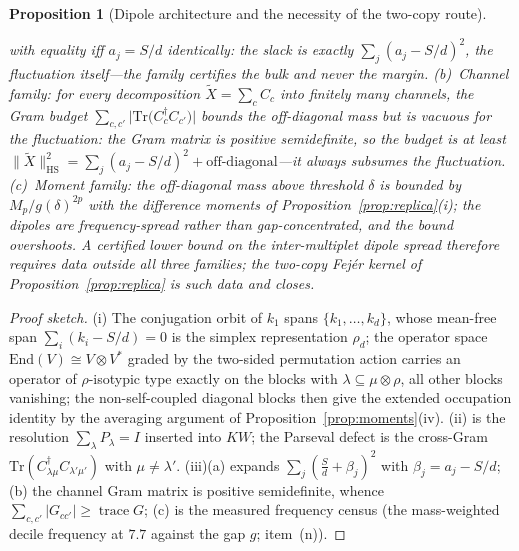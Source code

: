 \documentclass[11pt,a4paper]{article}
\theoremstyle{plain}
\newtheorem{proposition}[theorem]{Proposition}
\theoremstyle{definition}
\theoremstyle{remark}
\begin{document}
\begin{proposition}[Dipole architecture and the necessity of the two-copy
route]
\begin{enumerate}[leftmargin=1.6em]
with equality iff $a_j=S/d$ identically: the slack is exactly
$\sum_j(a_j-S/d)^{2}$, the fluctuation itself---the family certifies the
bulk and never the margin. (b)~\emph{Channel family:} for
\emph{every} decomposition $\widetilde X=\sum_cC_c$ into finitely many
channels, the Gram budget $\sum_{c,c'}\bigl|
\mathrm{Tr}\bigl(C_c^{\dagger}C_{c'}\bigr)\bigr|$ bounds the off-diagonal
mass but is vacuous for the fluctuation: the Gram matrix is positive
semidefinite, so the budget is at least
$\|\widetilde X\|_{\mathrm{HS}}^{2}
=\sum_j(a_j-S/d)^{2}+\text{off-diagonal}$---it always subsumes the
fluctuation. (c)~\emph{Moment family:} the off-diagonal mass above
threshold $\delta$ is bounded by $M_p/g(\delta)^{2p}$ with the difference
moments of Proposition~\ref{prop:replica}(i); the dipoles are
frequency-spread rather than gap-concentrated, and the bound overshoots.
A certified lower bound on the inter-multiplet dipole spread therefore
requires data outside all three families; the two-copy Fej\'er kernel of
Proposition~\ref{prop:replica} is such data and closes.
\end{enumerate}
\end{proposition}

\begin{proof}[Proof sketch]
(i) The conjugation orbit of $k_1$ spans $\{k_1,\dots,k_d\}$, whose
mean-free span $\sum_i(k_i-S/d)=0$ is the simplex representation
$\rho_d$; the operator space $\mathrm{End}(V)\cong V\otimes V^{*}$ graded
by the two-sided permutation action carries an operator of
$\rho$-isotypic type exactly on the blocks with
$\lambda\subseteq\mu\otimes\rho$, all other blocks vanishing; the
non-self-coupled diagonal blocks then give the extended occupation
identity by the averaging argument of Proposition~\ref{prop:moments}(iv).
(ii) is the resolution $\sum_{\lambda}P_{\lambda}=I$ inserted into
$KW$; the Parseval defect is the cross-Gram
$\mathrm{Tr}(C_{\lambda\mu}^{\dagger}C_{\lambda'\mu'})$ with
$\mu\neq\lambda'$. (iii)(a) expands $\sum_j(\tfrac{S}{d}+\beta_j)^{2}$
with $\beta_j=a_j-S/d$; (b) the channel Gram matrix is positive
semidefinite, whence $\sum_{c,c'}|G_{cc'}|\ge\operatorname{trace}G$;
(c) is the measured frequency census (the mass-weighted decile
frequency at $7.7$ against the gap $g$; item~(n)).
\end{proof}
\end{document}
